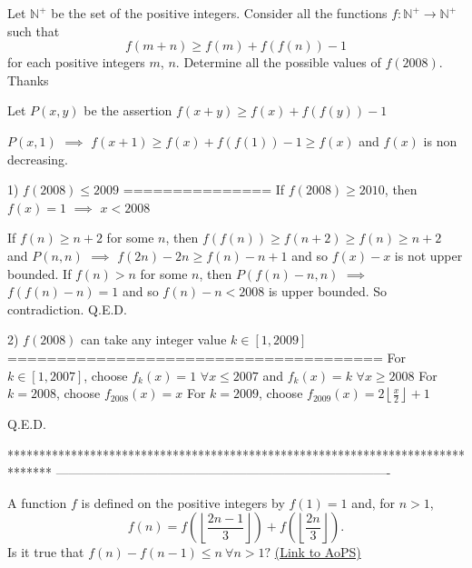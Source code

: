 \begin{solution}
	\begin{tcolorbox}Let $ \mathbb{N}^{+}$ be the set of the positive integers. Consider all the functions $f: \mathbb{N}^{+} \rightarrow \mathbb{N}^{+}$ such that 
\[f(m+n) \geq f(m) +f(f(n)) -1\]
for each positive integers $m$, $n$.
Determine all the possible values of $f(2008)$.
Thanks\end{tcolorbox}
Let $P(x,y)$ be the assertion $f(x+y)\ge f(x)+f(f(y))-1$

$P(x,1)$ $\implies$ $f(x+1)\ge f(x)+f(f(1))-1\ge f(x)$ and $f(x)$ is non decreasing.

1) $f(2008)\le 2009$ 
===============
If $f(2008)\ge 2010$, then $f(x)=1$ $\implies$ $x<2008$

If $f(n)\ge n+2$ for some $n$, then $f(f(n))\ge f(n+2)\ge f(n)\ge n+2$ and $P(n,n)$ $\implies$ $f(2n)-2n\ge f(n)-n+1$ and so $f(x)-x$ is not upper bounded.
If $f(n)>n$ for some $n$, then $P(f(n)-n,n)$ $\implies$ $f(f(n)-n)=1$ and so $f(n)-n<2008$ is upper bounded.
So contradiction.
Q.E.D.

2) $f(2008)$ can take any integer value $k\in[1,2009]$
======================================
For $k\in[1,2007]$, choose $f_k(x)=1$ $\forall x\le 2007$ and $f_k(x)=k$ $\forall x\ge 2008$
For $k=2008$, choose $f_{2008}(x)=x$
For $k=2009$, choose $f_{2009}(x)=2\left\lfloor\frac x2\right\rfloor+1$

Q.E.D.
\end{solution}
*******************************************************************************
-------------------------------------------------------------------------------

\begin{problem}
	A function $f$ is defined on the positive integers by $f(1)=1$ and, for $n>1$, \[f(n)=f\left(\left\lfloor \frac{2n-1}{3}\right\rfloor\right)+f\left(\left\lfloor \frac{2n}{3}\right\rfloor\right).\] Is it true that $f(n)-f(n-1)\le n\ \forall n>1?$
	\flushright \href{https://artofproblemsolving.com/community/c6h569021}{(Link to AoPS)}
\end{problem}



